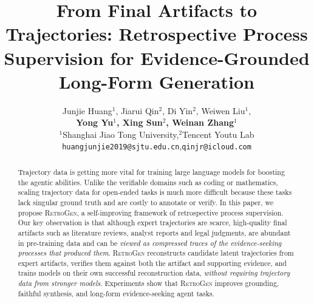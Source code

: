 \documentclass[11pt]{article}
\title{From Final Artifacts to Trajectories: Retrospective Process Supervision for Evidence-Grounded Long-Form Generation}
\author{
Junjie Huang$^{1}$, Jiarui Qin$^{2}$, Di Yin$^{2}$, Weiwen Liu$^{1}$, \\
\textbf{Yong Yu$^{1}$, Xing Sun$^{2}$, Weinan Zhang$^{1}$} \\
$^{1}$Shanghai Jiao Tong University,\enspace$^{2}$Tencent Youtu Lab \\
\texttt{huangjunjie2019@sjtu.edu.cn},\enspace \texttt{qinjr@icloud.com}
}
\begin{document}
\maketitle
\begin{abstract}
Trajectory data is getting more vital for training large language models for boosting the agentic abilities. 
Unlike the verifiable domains such as coding or mathematics, scaling trajectory data for open-ended tasks is much more difficult because these tasks lack singular ground truth and are costly to annotate or verify.
In this paper, we propose \textsc{RetroGen}, a self-improving framework of retrospective process supervision. 
Our key observation is that although expert trajectories are scarce, high-quality final artifacts such as literature reviews, analyst reports and legal judgments, are abundant in pre-training data and can be \textit{viewed as compressed traces of the evidence-seeking processes that produced them}.  
\textsc{RetroGen} reconstructs candidate latent trajectories from expert artifacts, verifies them against both the artifact and supporting evidence, and trains models on their own successful reconstruction data, \textit{without requiring trajectory data from stronger models}. 
Experiments show that \textsc{RetroGen} improves grounding, faithful synthesis, and long-form evidence-seeking agent tasks.
\end{abstract}












\newpage


\end{document}
